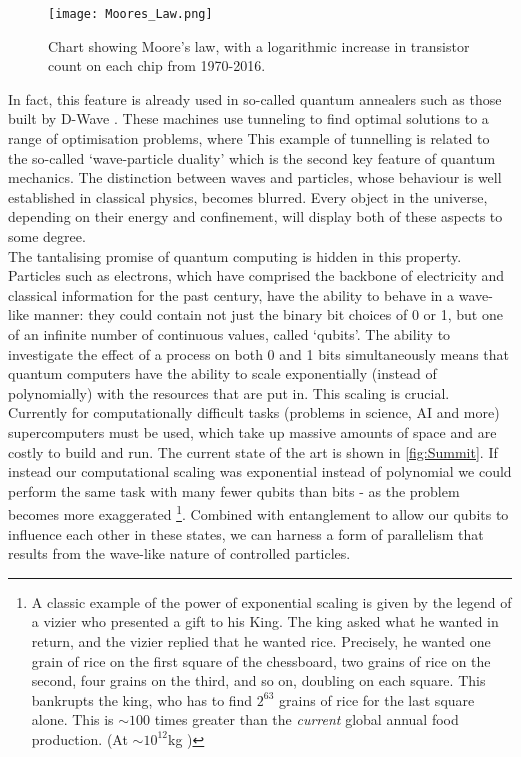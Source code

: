 \begin{figure}[!ht]
	\centering
	\texttt{[image: Moores\_Law.png]}
	\caption{Chart showing Moore's law, with a logarithmic increase in transistor 	count on each chip from 1970-2016.}
	\label{fig:Moore's_Law}
\end{figure}

In fact, this feature is already used in so-called quantum annealers such as those built by D-Wave \cite{D-Wave}. These machines use tunneling to find optimal solutions to a range of optimisation problems, where  This example of tunnelling is related to the so-called `wave-particle duality' which is the second key feature of quantum mechanics. The distinction between waves and particles, whose behaviour is well established in classical physics, becomes blurred. Every object in the universe, depending on their energy and confinement, will display both of these aspects to some degree. \\

The tantalising promise of quantum computing is hidden in this property. Particles such as electrons, which have comprised the backbone of electricity and classical information for the past century, have the ability to behave in a wave-like manner: they could contain not just the binary bit choices of 0 or 1,  but one of an infinite number of continuous values, called `qubits'. The ability to investigate the effect of a process on both 0 and 1 bits simultaneously means that quantum computers have the ability to scale exponentially (instead of polynomially) with the resources  that are put in. This scaling is crucial. Currently for computationally difficult tasks (problems in science, AI and more) supercomputers must be used, which take up massive amounts of space and are costly to build and run. The current state of the art is shown in  \autoref{fig:Summit}. If instead our computational scaling was exponential instead of polynomial we could perform the same task with many fewer qubits than bits - as the problem becomes more exaggerated \footnote{A classic example of the power of exponential scaling is given by the legend of a vizier who presented a gift to his King. The king asked what he wanted in return, and the vizier replied that he wanted rice. Precisely, he wanted one grain of rice on the first square of the chessboard, two grains of rice on the second, four grains on the third, and so on, doubling on each square. This bankrupts the king, who has to find $2^{63}$ grains of rice for the last square alone. This is $\sim 100$ times greater than the \emph{current} global annual food production. (At $\sim 10^{12}$kg \cite{Globalfoodproduction})}. Combined with entanglement to allow our qubits to influence each other in these states, we can harness a form of parallelism that results from the wave-like nature of controlled particles.  \\

